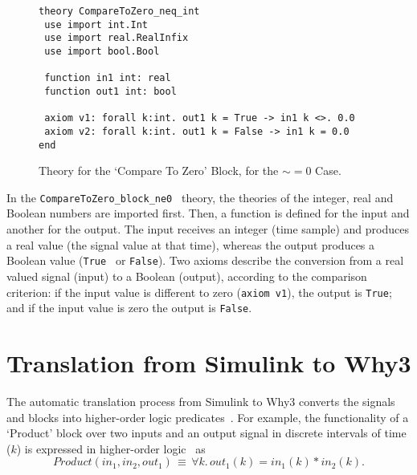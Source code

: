 \documentclass[a4paper]{article}
\begin{document}
\begin{figure}[!t]
\centering
\begin{verbatim}
theory CompareToZero_neq_int
 use import int.Int  
 use import real.RealInfix
 use import bool.Bool
 
 function in1 int: real
 function out1 int: bool
 
 axiom v1: forall k:int. out1 k = True -> in1 k <>. 0.0
 axiom v2: forall k:int. out1 k = False -> in1 k = 0.0 
end
\end{verbatim}
\caption{Theory for the `Compare To Zero' Block, for the $\sim = 0$ Case.}
\label{theory2}
\end{figure}

In the \verb+CompareToZero_block_ne0 + theory, the theories of the integer, real and Boolean numbers are imported first. Then, a function is defined for the input and another for the output. The input receives an integer (time sample) and produces a real value (the signal value at that time), whereas the output produces a Boolean value (\verb+True + or \verb+False+). Two axioms describe the conversion from a real valued signal (input) to a Boolean (output), according to the comparison criterion: if the input value is different to zero (\verb+axiom v1+), the output is \verb+True+; and if the input value is zero the output is \verb+False+. 

\section{Translation from Simulink to Why3} \label{translation}

The automatic translation process from Simulink to Why3 converts the signals and blocks into higher-order logic predicates~\cite{Hardware}. For example, the functionality of a `Product' block over two inputs and an output signal in discrete intervals of time ($k$) is expressed in higher-order logic~\cite{Hardware} as
\begin{equation}
Product(in_1,in_2,out_1) \,\equiv \, \forall k. \,out_1(k)=in_1(k)*in_2(k).
\end{equation}
\end{document}
